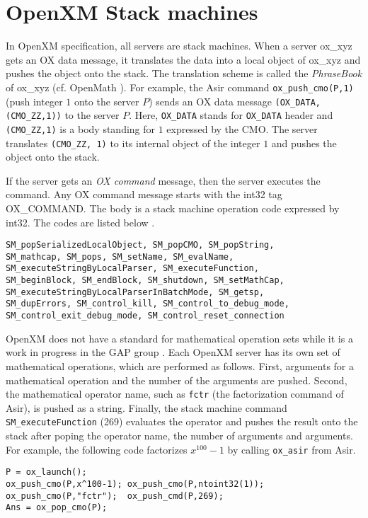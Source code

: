 
\section{OpenXM Stack machines}\label{sec:ox-stackmachines}

In OpenXM specification, all servers are stack machines.
When a server ox\_xyz gets an OX data message,
it translates the data into a local object of ox\_xyz
and pushes the object onto the stack.
The translation scheme 
is called the {\it PhraseBook} of ox\_xyz (cf. OpenMath \cite{OpenMath}).
For example, the Asir command {\tt ox\_push\_cmo(P,1)}
(push integer $1$ onto the server $P$)
sends an OX data message
{\tt (OX\_DATA,(CMO\_ZZ,1))} to the server $P$.
Here,
{\tt OX\_DATA} stands for {\tt OX\_DATA} header and 
{\tt (CMO\_ZZ,1)} is a body standing for $1$ expressed 
by the CMO.
The server translates {\tt (CMO\_ZZ, 1)} to its internal object of
the integer  $1$
and pushes the object onto the stack.

If the server gets an {\it OX command} message, then the server 
executes the command.
Any OX command message starts with the int32 tag OX\_COMMAND.
The body is a stack machine operation code expressed by int32.
The codes are listed below \cite{noro-takayama}.
\begin{verbatim}
SM_popSerializedLocalObject, SM_popCMO, SM_popString,
SM_mathcap, SM_pops, SM_setName, SM_evalName,
SM_executeStringByLocalParser, SM_executeFunction,
SM_beginBlock, SM_endBlock, SM_shutdown, SM_setMathCap,
SM_executeStringByLocalParserInBatchMode, SM_getsp,
SM_dupErrors, SM_control_kill, SM_control_to_debug_mode,
SM_control_exit_debug_mode, SM_control_reset_connection
\end{verbatim}

OpenXM does not have a standard for mathematical operation sets
while it is a work in progress in the GAP group \cite{gap}.
Each OpenXM server has its own set of mathematical operations,
which are performed as follows.
First, arguments for a mathematical operation
and the number of the arguments are pushed.
Second, 
the mathematical operator name, 
such as {\tt fctr} (the factorization command of Asir),
is pushed as a string.
Finally, the stack machine command
{\tt SM\_executeFunction} (269) evaluates the operator and
pushes the result onto the stack
after poping the operator name, the number of arguments
and arguments.
For example, the following code factorizes $x^{100}-1$ by calling
{\tt ox\_asir} from Asir.
\begin{verbatim}
P = ox_launch(); 
ox_push_cmo(P,x^100-1); ox_push_cmo(P,ntoint32(1));
ox_push_cmo(P,"fctr");  ox_push_cmd(P,269); 
Ans = ox_pop_cmo(P);
\end{verbatim}

